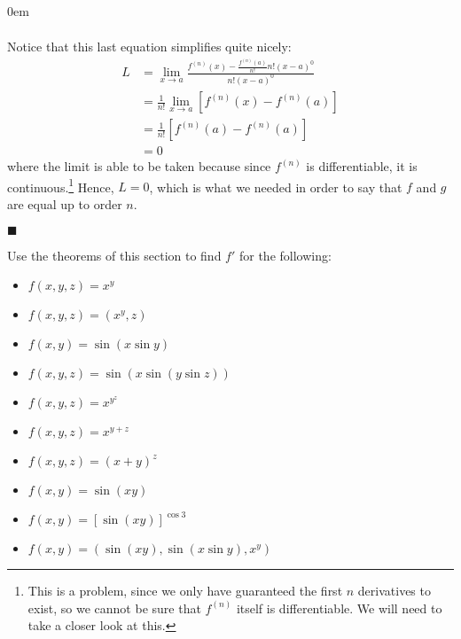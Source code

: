 \documentclass[12pt]{article}
\renewcommand{\qed}{\hfill$\blacksquare$}
\renewenvironment{proof}{\begin{addmargin}[1em]{0em}\begin{newproof}}{\end{newproof}\end{addmargin}\qed}
\newenvironment{problem}[2][Problem]{\begin{trivlist}
\item[\hskip \labelsep {\bfseries #1}\hskip \labelsep {\bfseries #2.}]}{\end{trivlist}}
\begin{document}
\begin{proof}
\begin{itemize}
\begin{equation*}
\begin{split}
\end{split}\end{equation*}
Notice that this last equation simplifies quite nicely:
\begin{equation*}\begin{split}
L & = \lim_{x\rightarrow a} \frac{f^{\left(n\right)}\left(x\right) - \frac{f^{\left(n\right)}\left(a\right)}{n!} n! \left(x-a\right)^0}{n! \left(x-a\right)^0} \\
& = \frac{1}{n!} \lim_{x\rightarrow a}  \left[ f^{\left(n\right)}\left(x\right) - f^{\left(n\right)} \left(a\right) \right] \\
& = \frac{1}{n!} \left[ f^{\left(n\right)} \left(a\right) - f^{\left(n\right)} \left(a\right)\right] \\
& = 0
\end{split}\end{equation*}
where the limit is able to be taken because since $f^{\left(n\right)}$ is differentiable, it is continuous.\footnote{This is a problem, since we only have guaranteed the first $n$ derivatives to exist, so we cannot be sure that $f^{\left(n\right) }$ itself is differentiable. We will need to take a closer look at this.} Hence, $L =0$, which is what we needed in order to say that $f$ and $g$ are equal up to order $n$.
\end{itemize}
\end{proof}







\begin{problem}{2.10}
Use the theorems of this section to find $f'$ for the following:
\begin{itemize}
	\item $f\left(x,y,z\right) = x^y $
	\item $f\left(x,y,z\right) = \left(x^y, z\right)$
	\item $f\left(x,y\right) = \sin \left(x\sin y\right)$
	\item $f\left(x,y,z\right) = \sin \left( x\sin \left(y\sin z\right) \right)$
	\item $f\left(x,y,z\right) = x^{y^z} $
	\item $f\left(x,y,z\right) = x^{y+z} $
	\item $f\left(x,y,z\right) = \left(x+y\right)^z $
	\item $f\left(x,y\right) = \sin\left(xy\right) $
	\item $f\left(x,y\right) = \left[\sin \left(xy\right) \right]^{\cos 3} $
	\item $f\left(x,y\right) = \left( \sin \left(xy\right), \sin\left(x \sin y\right), x^y \right)$
\end{itemize}
\end{problem}
\end{document}
